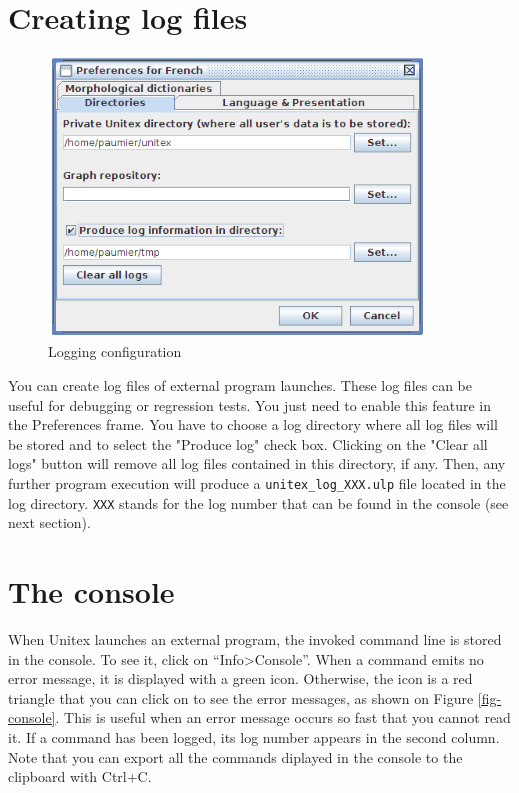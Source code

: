 \section{Creating log files}
\label{section-creating-log-files}

\bigskip
\begin{figure}[!h]
\begin{center}
\includegraphics[width=10cm]{resources/img/fig11-1a.png}
\caption{Logging configuration\label{fig-logging-config}}
\end{center}
\end{figure}

You can create log files of external program launches. These log files can be useful for debugging
or regression tests. You just need to enable this feature in the Preferences frame. You have
to choose a log directory where all log files will be stored and to select the "Produce log"
check box. Clicking on the "Clear all logs" button will remove all log files contained in this directory,
if any. Then, any further program execution will produce a \verb+unitex_log_XXX.ulp+ file located in the log 
directory. \verb+XXX+ stands for the log number that can be found in the console (see next section).



\section{The console}
\label{section-console}
When Unitex launches an external program, the invoked command line is stored in
the console. To see it, click on ``Info>Console''. When a command emits
no error message, it is displayed with a green icon. Otherwise, the icon is a red
triangle that you can click on to see the error messages, as shown on Figure
\ref{fig-console}. This is useful when an error message occurs so fast that you
cannot read it. If a command has been logged, its log number appears in the second column.
Note that you can export all the commands diplayed in the
console to the clipboard with Ctrl+C.

